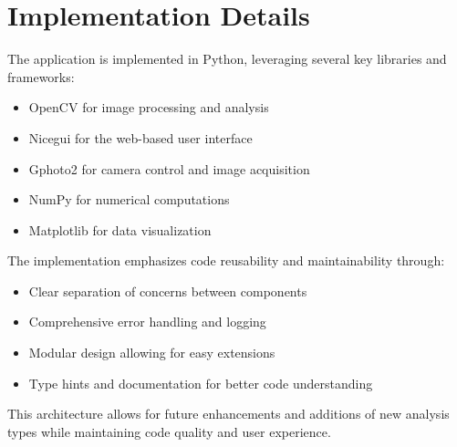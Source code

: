 \section{Implementation Details}

The application is implemented in Python, leveraging several key libraries and frameworks:

\begin{itemize}
    \item OpenCV for image processing and analysis
    \item Nicegui for the web-based user interface
    \item Gphoto2 for camera control and image acquisition
    \item NumPy for numerical computations
    \item Matplotlib for data visualization
\end{itemize}

The implementation emphasizes code reusability and maintainability through:

\begin{itemize}
    \item Clear separation of concerns between components
    \item Comprehensive error handling and logging
    \item Modular design allowing for easy extensions
    \item Type hints and documentation for better code understanding
\end{itemize}

This architecture allows for future enhancements and additions of new analysis types while maintaining code quality and user experience.
